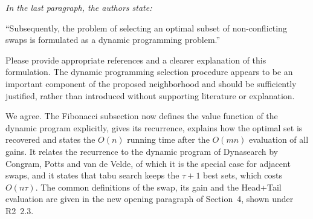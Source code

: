 \documentclass[12pt]{article}
\newenvironment{rc}[1]{\par\medskip\noindent\itshape\renewcommand{\emph}[1]{\textbf{##1}}\ignorespaces}{\par}
\newcommand{\answer}[1]{\par\smallskip\noindent #1\par}
\begin{document}
\begin{rc}{R2 2.2 --- Fibonacci neighborhood: dynamic programming}
In the last paragraph, the authors state:

``Subsequently, the problem of selecting an optimal subset of non-conflicting swaps is formulated as a dynamic programming problem.''

Please provide appropriate references and a clearer explanation of this formulation. The dynamic programming selection procedure appears to be an important component of the proposed neighborhood and should be sufficiently justified, rather than introduced without supporting literature or explanation.
\end{rc}
\answer{We agree. The Fibonacci subsection now defines the value function of the dynamic program explicitly, gives its recurrence, explains how the optimal set is recovered and states the $O(n)$ running time after the $O(mn)$ evaluation of all gains. It relates the recurrence to the dynamic program of Dynasearch by Congram, Potts and van de Velde, of which it is the special case for adjacent swaps, and it states that tabu search keeps the $\tau+1$ best sets, which costs $O(n\tau)$. The common definitions of the swap, its gain and the Head+Tail evaluation are given in the new opening paragraph of Section~4, shown under R2~2.3.}
\end{document}
